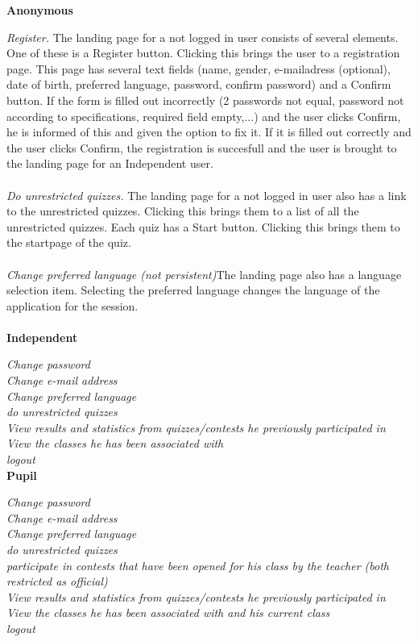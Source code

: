 \textbf{Anonymous}


    \textit{Register.} The landing page for a not logged in user consists of several elements. One of these is a Register button. Clicking this brings the user to a registration page. This page has several text fields (name, gender, e-mailadress (optional), date of birth, preferred language, password, confirm password) and a Confirm button. If the form is filled out incorrectly (2 passwords not equal, password not according to specifications, required field empty,...) and the user clicks Confirm, he is informed of this and given the option to fix it. If it is filled out correctly and the user clicks Confirm, the registration is succesfull and the user is brought to the landing page for an Independent user. \\ \\
	\textit{Do unrestricted quizzes.} The landing page for a not logged in user also has a link to the unrestricted quizzes. Clicking this brings them to a list of all the unrestricted quizzes. Each quiz has a Start button. Clicking this brings them to the startpage of the quiz.\\ \\
    \textit{Change preferred language (not persistent)}The landing page also has a language selection item. Selecting the preferred language changes the language of the application for the session.\\ \\

\textbf{Independent}

    \textit{Change password}\\
    \textit{Change e-mail address}\\
    \textit{Change preferred language}\\
    \textit{do unrestricted quizzes}\\
    \textit{View results and statistics from quizzes/contests he previously participated in}\\
    \textit{View the classes he has been associated with}\\
    \textit{logout}\\

\textbf{Pupil}

    \textit{Change password}\\
    \textit{Change e-mail address}\\
    \textit{Change preferred language}\\
    \textit{do unrestricted quizzes}\\
    \textit{participate in contests that have been opened for his class by the teacher (both restricted as official)}\\
    \textit{View results and statistics from quizzes/contests he previously participated in}\\
    \textit{View the classes he has been associated with and his current class}\\
	\textit{logout}
